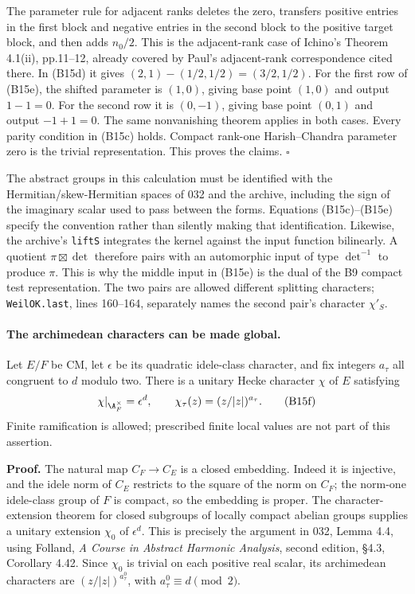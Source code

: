 The parameter rule for adjacent ranks deletes the zero, transfers positive entries in the first block and negative entries in the second block to the positive target block, and then adds $n_0/2$. This is the adjacent-rank case of Ichino's Theorem 4.1(ii), pp.11--12, already covered by Paul's adjacent-rank correspondence cited there. In (B15d) it gives $(2,1)-(1/2,1/2)=(3/2,1/2)$. For the first row of (B15e), the shifted parameter is $(1,0)$, giving base point $(1,0)$ and output $1-1=0$. For the second row it is $(0,-1)$, giving base point $(0,1)$ and output $-1+1=0$. The same nonvanishing theorem applies in both cases. Every parity condition in (B15c) holds. Compact rank-one Harish--Chandra parameter zero is the trivial representation. This proves the claims. \hfill$\square$

The abstract groups in this calculation must be identified with the Hermitian/skew-Hermitian spaces of 032 and the archive, including the sign of the imaginary scalar used to pass between the forms. Equations (B15c)--(B15e) specify the convention rather than silently making that identification. Likewise, the archive's \texttt{liftS} integrates the kernel against the input function bilinearly. A quotient $\pi\boxtimes\det$ therefore pairs with an automorphic input of type $\det^{-1}$ to produce $\pi$. This is why the middle input in (B15e) is the dual of the B9 compact test representation. The two pairs are allowed different splitting characters; \texttt{WeilOK.last}, lines 160--164, separately names the second pair's character $\chi'_S$.

\paragraph{The archimedean characters can be made global.}
Let $E/F$ be CM, let $\epsilon$ be its quadratic idele-class character, and fix integers $a_\tau$ all congruent to $d$ modulo two. There is a unitary Hecke character $\chi$ of $E$ satisfying
\[
 \chi|_{\A_F^\times}=\epsilon^d,
 \qquad \chi_\tau(z)=(z/|z|)^{a_\tau}.
 \tag{B15f}
\]
Finite ramification is allowed; prescribed finite local values are not part of this assertion.

\textbf{Proof.}
The natural map $C_F\to C_E$ is a closed embedding. Indeed it is injective, and the idele norm of $C_E$ restricts to the square of the norm on $C_F$; the norm-one idele-class group of $F$ is compact, so the embedding is proper. The character-extension theorem for closed subgroups of locally compact abelian groups supplies a unitary extension $\chi_0$ of $\epsilon^d$. This is precisely the argument in 032, Lemma 4.4, using Folland, \emph{A Course in Abstract Harmonic Analysis}, second edition, \S4.3, Corollary 4.42. Since $\chi_0$ is trivial on each positive real scalar, its archimedean characters are $(z/|z|)^{a^0_\tau}$, with $a^0_\tau\equiv d\pmod2$.

